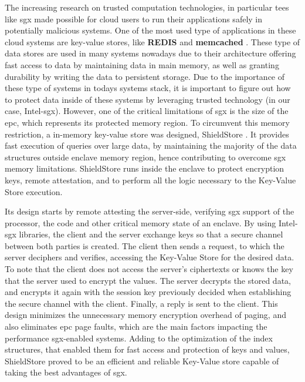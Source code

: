 The increasing research on trusted computation technologies, in particular \gls{tee}s like \gls{sgx} made possible for cloud users to run their applications safely in potentially malicious systems. One of the most used type of applications in these cloud systems are key-value stores, like \textbf{REDIS} \cite{redisWebsite} and \textbf{memcached} \cite{memcachedWebsite}. These type of data stores are used in many systems nowadays due to their architecture offering fast access to data by maintaining data in main memory, as well as granting durability by writing the data to persistent storage.  Due to the importance of these type of systems in todays systems stack, it is important to figure out how to protect data inside of these systems by leveraging trusted technology (in our case, Intel-\gls{sgx}). However, one of the critical limitations of \gls{sgx} is the size of the \gls{epc}, which represents its protected memory region. 
To circumvent this memory restriction, a in-memory key-value store was designed, ShieldStore \cite{shieldStorePaper}. It provides fast execution of queries over large data, by maintaining the majority of the data structures outside enclave memory region, hence contributing to overcome \gls{sgx} memory limitations.
ShieldStore runs inside the enclave to protect encryption keys, remote attestation, and to perform all the logic necessary to the Key-Value Store execution.

Its design starts by remote attesting the server-side, verifying \gls{sgx} support of the processor, the code and other critical memory state of an enclave. By using Intel-\gls{sgx} libraries, the client and the server exchange keys so that a secure channel between both parties is created. The client then sends a request, to which the server deciphers and verifies, accessing the Key-Value Store for the desired data. To note that the client does not access the server's ciphertexts or knows the key that the server used to encrypt the values. The server decrypts the stored data, and encrypts it again with the session key previously decided when establishing the secure channel with the client. Finally, a reply is sent to the client.    
This design minimizes the unnecessary memory encryption overhead of paging, and also eliminates \gls{epc} page faults, which are the main factors impacting the performance \gls{sgx}-enabled systems. Adding to the optimization of the index structures, that enabled them for fast access and protection of keys and values, ShieldStore proved to be an efficient and reliable Key-Value store capable of taking the best advantages of \gls{sgx}.\newline


